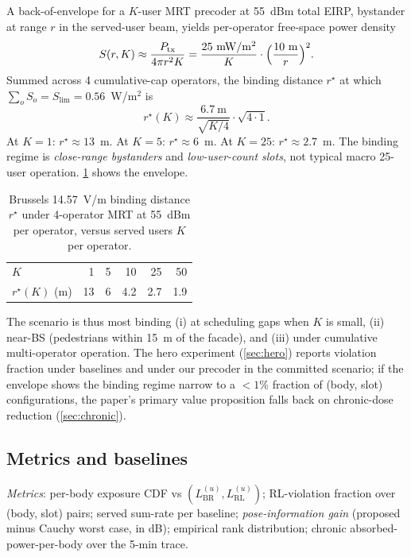 \documentclass[journal,twocolumn,10pt]{IEEEtran}
\theoremstyle{definition}
\newcommand{\Ptx}{P_{\mathrm{tx}}}
\begin{document}
A back-of-envelope for a $K$-user MRT precoder at 55~dBm total
EIRP, bystander at range $r$ in the served-user beam, yields
per-operator free-space power density
\begin{equation}\label{eq:envelope}
  S(r,K)\approx \frac{\Ptx}{4\pi r^2 K}
  = \frac{25~\mathrm{mW/m^2}}{K}\cdot\Bigl(\frac{10~\mathrm{m}}{r}\Bigr)^2.
\end{equation}
Summed across 4 cumulative-cap operators, the binding distance
$r^\star$ at which $\sum_o S_o=S_{\mathrm{lim}}=0.56$~W/m$^2$ is
\begin{equation}
  r^\star(K)\approx \frac{6.7~\mathrm{m}}{\sqrt{K/4}}\cdot\sqrt{4\cdot 1}.
\end{equation}
At $K=1$: $r^\star\approx 13$~m. At $K=5$: $r^\star\approx 6$~m. At
$K=25$: $r^\star\approx 2.7$~m. The binding regime is
\emph{close-range bystanders} and \emph{low-user-count slots},
not typical macro 25-user operation. \cref{tab:bind} shows the
envelope.

\begin{table}[!t]
\centering
\caption{Brussels 14.57~V/m binding distance $r^\star$ under
4-operator MRT at 55~dBm per operator, versus served users
$K$ per operator.}
\label{tab:bind}
\begin{tabular}{@{}lrrrrr@{}}
\toprule
$K$               & 1  & 5  & 10 & 25 & 50 \\
$r^\star(K)$ (m)  & 13 & 6  & 4.2& 2.7& 1.9\\
\bottomrule
\end{tabular}
\end{table}

The scenario is thus most binding (i) at scheduling gaps when
$K$ is small, (ii) near-BS (pedestrians within 15~m of the
facade), and (iii) under cumulative multi-operator operation.
The hero experiment (\cref{sec:hero}) reports violation fraction
under baselines and under our precoder in the committed scenario;
if the envelope shows the binding regime narrow to a $<1\%$
fraction of (body, slot) configurations, the paper's primary
value proposition falls back on chronic-dose reduction
(\cref{sec:chronic}).

\subsection{Metrics and baselines}

\emph{Metrics}: per-body exposure CDF vs
$(L^{(u)}_{\mathrm{BR}}, L^{(u)}_{\mathrm{RL}})$; RL-violation
fraction over (body, slot) pairs; served sum-rate per
baseline; \emph{pose-information gain} (proposed minus Cauchy
worst case, in dB); empirical rank distribution; chronic
absorbed-power-per-body over the 5-min trace.
\end{document}
